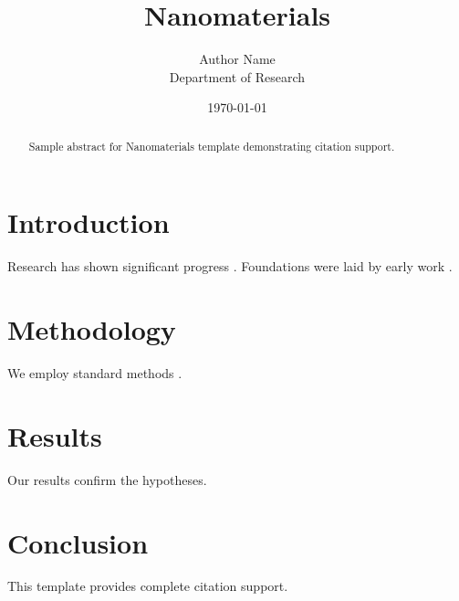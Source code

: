 \documentclass{mdpi}
\title{Nanomaterials}
\author{Author Name \\ \small Department of Research}
\date{\today}
\begin{document}
\maketitle

\begin{abstract}
Sample abstract for Nanomaterials template demonstrating citation support.
\end{abstract}

\section{Introduction}
Research has shown significant progress \citep{einstein1905}. Foundations were laid by early work \citep{turing1950}.

\section{Methodology}
We employ standard methods \citep{knuth1984}.

\section{Results}
Our results confirm the hypotheses.

\section{Conclusion}
This template provides complete citation support.



\end{document}
